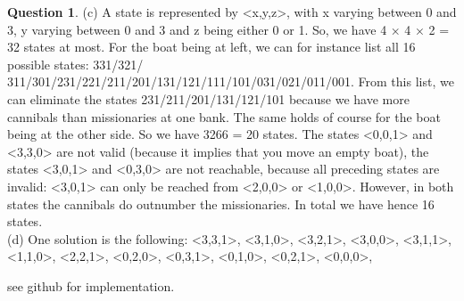 \documentclass[11pt,a4paper]{article}
\theoremstyle{definition}%
\newtheorem{Q}{Question}[] %
\begin{document}
\begin{Q}
{(c) A state is represented by <x,y,z>, with x varying between 0 and 3, y varying between
0 and 3 and z being either 0 or 1. So, we have 4 × 4 × 2 = 32 states at most.
For the boat being at left, we can for instance list all 16 possible states: 331/321/
311/301/231/221/211/201/131/121/111/101/031/021/011/001.
From this list, we can eliminate the states 231/211/201/131/121/101 
because we have more cannibals than missionaries at one bank. The same holds of
course for the boat being at the other side. So we have 3266 = 20 states.
The states <0,0,1> and <3,3,0> are not valid (because it implies that you move
an empty boat), the states <3,0,1> and <0,3,0> are not reachable, because
all preceding states are invalid: <3,0,1> can only be reached from <2,0,0> or
<1,0,0>. However, in both states the cannibals do outnumber the missionaries. In
total we have hence 16 states.\\
(d) One solution is the following:
<3,3,1>, <3,1,0>, <3,2,1>, <3,0,0>, <3,1,1>, <1,1,0>, <2,2,1>,
<0,2,0>, <0,3,1>, <0,1,0>, <0,2,1>, <0,0,0>,

see github for implementation.

}
\end{Q}
\end{document}
